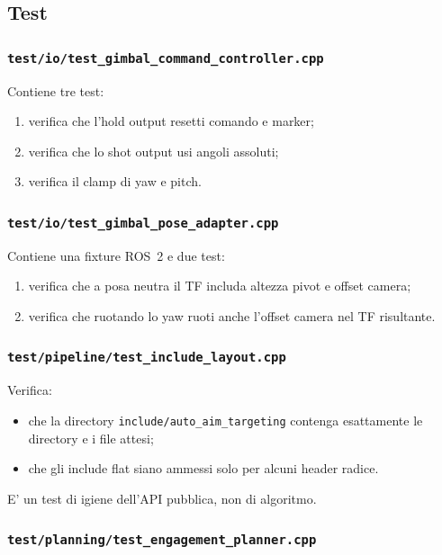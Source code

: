 \documentclass[11pt,a4paper]{article}
\newcommand{\code}[1]{\texttt{#1}}
\begin{document}
\subsection{Test}

\subsubsection{\code{test/io/test\_gimbal\_command\_controller.cpp}}

Contiene tre test:
\begin{enumerate}[leftmargin=1.4em]
  \item verifica che l'hold output resetti comando e marker;
  \item verifica che lo shot output usi angoli assoluti;
  \item verifica il clamp di yaw e pitch.
\end{enumerate}

\subsubsection{\code{test/io/test\_gimbal\_pose\_adapter.cpp}}

Contiene una fixture ROS~2 e due test:
\begin{enumerate}[leftmargin=1.4em]
  \item verifica che a posa neutra il TF includa altezza pivot e offset camera;
  \item verifica che ruotando lo yaw ruoti anche l'offset camera nel TF risultante.
\end{enumerate}

\subsubsection{\code{test/pipeline/test\_include\_layout.cpp}}

Verifica:
\begin{itemize}[leftmargin=1.4em]
  \item che la directory \code{include/auto\_aim\_targeting} contenga esattamente le directory e i file attesi;
  \item che gli include flat siano ammessi solo per alcuni header radice.
\end{itemize}

E' un test di igiene dell'API pubblica, non di algoritmo.

\subsubsection{\code{test/planning/test\_engagement\_planner.cpp}}
\end{document}
